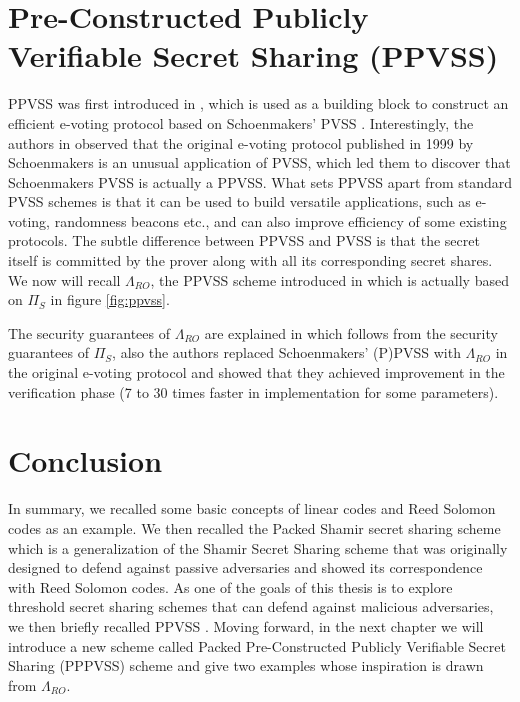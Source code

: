 \section{Pre-Constructed Publicly Verifiable Secret Sharing (PPVSS)}
\label{sec:ppvss}
PPVSS was first introduced in \cite{cryptoeprint:2025/576}, which is used as a building block to 
construct an efficient e-voting protocol based on Schoenmakers' PVSS \cite{5581ccd9530540479539d21d1d39ae96}. 
Interestingly, the authors in \cite{cryptoeprint:2025/576} observed that the original e-voting protocol 
published in 1999 by Schoenmakers is an unusual application of PVSS, which led them to discover that 
Schoenmakers PVSS is actually a PPVSS. What sets PPVSS apart from standard PVSS schemes 
is that it can be used to build versatile applications, such as e-voting, randomness beacons etc., and can 
also improve efficiency of some existing protocols. The subtle difference between PPVSS and PVSS is that the 
secret itself is committed by the prover along with all its corresponding secret shares. We now will recall 
$\Lambda_{RO}$, the PPVSS scheme introduced in \cite{cryptoeprint:2025/576} which is actually based on 
$\Pi_S$\cite{cryptoeprint:2023/1669} in figure \ref{fig:ppvss}.\par 

The security guarantees of $\Lambda_{RO}$ are explained in \cite{cryptoeprint:2025/576} which follows from 
the security guarantees of $\Pi_S$, also the authors replaced Schoenmakers' (P)PVSS with $\Lambda_{RO}$ in 
the original e-voting protocol\cite{5581ccd9530540479539d21d1d39ae96} and showed that they achieved 
improvement in the verification phase (7 to 30 times faster in implementation for some parameters). 



\section{Conclusion}
In summary, we recalled some basic concepts of linear codes and Reed Solomon codes as an example. We then 
recalled the Packed Shamir secret sharing scheme which is a generalization of the Shamir Secret Sharing scheme \cite{10.1145/359168.359176} 
that was originally designed to defend against passive adversaries and showed its correspondence with 
Reed Solomon codes. As one of the goals of this thesis is to explore threshold secret sharing schemes that 
can defend against malicious adversaries, we then briefly recalled PPVSS \cite{cryptoeprint:2025/576}. Moving forward, in the next chapter we will introduce a new scheme called Packed Pre-Constructed Publicly 
Verifiable Secret Sharing (PPPVSS) scheme and give two examples whose inspiration is drawn from $\Lambda_{RO}$.

